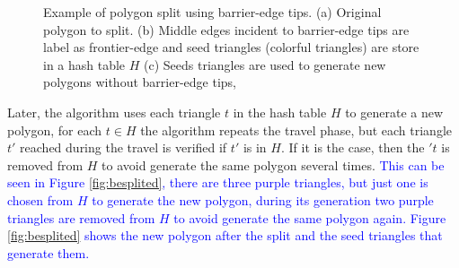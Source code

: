 \documentclass[pdflatex,sn-mathphys]{sn-jnl}%
\theoremstyle{thmstyleone}%
\theoremstyle{thmstyletwo}%
\theoremstyle{thmstylethree}%
\begin{document}
\begin{figure}[h]
\centering  
{}
\caption{Example of polygon split using barrier-edge tips. (a) Original polygon to split. (b) Middle edges incident to barrier-edge tips are label as frontier-edge and seed triangles (colorful triangles) are store in a hash table $H$ (c) Seeds triangles are used to generate new polygons without barrier-edge tips,  }
\label{figs:splitmid} 
\end{figure}

Later, the algorithm uses each triangle $t$ in the hash table $H$ to generate a new polygon, for each $t \in H$ the algorithm repeats the travel phase, but each triangle $t'$ reached during the travel is verified if $t'$ is in $H$. If it is the case, then the $'t$ is removed from $H$ to avoid generate the same polygon several times. \textcolor{blue}{This can be seen in Figure \ref{fig:besplited}, there are three purple triangles, but just one is chosen from $H$ to generate the new polygon, during its generation two purple triangles are removed from $H$ to avoid generate the same polygon again. Figure \ref{fig:besplited} shows the new polygon after the split and the seed triangles that generate them.}  %
\end{document}
